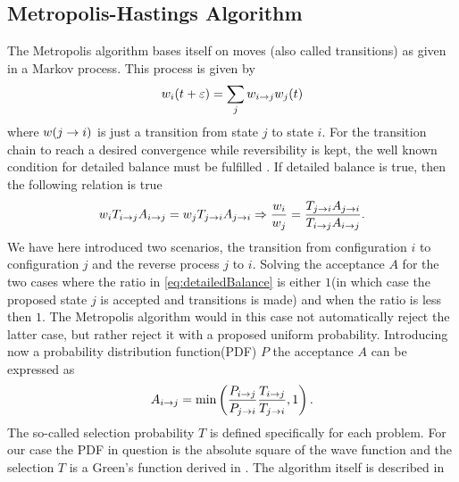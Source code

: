     \subsection{Metropolis-Hastings Algorithm\label{susec:MHAlg}}
        The Metropolis algorithm bases itself on moves (also called
        transitions) as given in a Markov process\cite{NeOr, FeWa}. This
        process is given by
            \begin{equation}
                w_i(t+\varepsilon) = \sum_jw_{i\rightarrow j}w_j(t)
            \end{equation}
        where $w(j\rightarrow i)$ is just a transition from state $j$ to state $i$.
        For the transition chain to reach a desired convergence while
        reversibility is kept, the well known condition for detailed balance
        must be fulfilled \cite{statmech}. If detailed balance is true, then the
        following relation is true
            \begin{equation}
                w_i T_{i\rightarrow j}A_{i\rightarrow j} = w_j T_{j\rightarrow i}A_{j\rightarrow i}
                \Rightarrow \frac{w_i}{w_j} =
                \frac{T_{j\rightarrow i}A_{j\rightarrow i}}{T_{i\rightarrow j}A_{i\rightarrow j}}.
                \label{eq:detailedBalance}
            \end{equation}
        We have here introduced two scenarios, the transition from
        configuration $i$ to configuration $j$ and the reverse process $j$ to
        $i$. Solving the acceptance $A$ for the two cases where the ratio in
        \ref{eq:detailedBalance} is either $1$(in which case the proposed state
        $j$ is accepted and transitions is made) and when the ratio is less
        then $1$. The Metropolis algorithm would in this case not automatically
        reject the latter case, but rather reject it with a proposed uniform
        probability. Introducing now a probability distribution function(PDF) $P$
        the acceptance $A$ can be expressed as
            \begin{equation}
                A_{i\rightarrow j} =
                \text{min}\left(\frac{P_{i\rightarrow j}}{P_{j\rightarrow i}}
                \frac{T_{i\rightarrow j}}{T_{j\rightarrow i}} ,1\right).
                \label{eq:metropolisAcceptance}
            \end{equation}
        The so-called selection probability $T$ is defined specifically for
        each problem. For our case the PDF in question is the absolute square
        of the wave function and the selection $T$ is a Green's function
        derived in . The algorithm itself is described in

